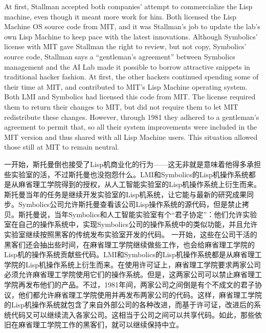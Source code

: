 \ifdefined\eng
\ifdefined\vone
At first, Stallman accepted both companies' attempt to commercialize the Lisp machine, even though it meant more work for him. Both licensed the Lisp Machine OS source code from MIT, and it was Stallman's job to update the lab's own Lisp Machine to keep pace with the latest innovations. Although Symbolics' license with MIT gave Stallman the right to review, but not copy, Symbolics' source code, Stallman says a ``gentleman's agreement'' between Symbolics management and the AI Lab made it possible to borrow attractive snippets in traditional hacker fashion.
\fi
\ifdefined\vtwo
At first, the other hackers continued spending some of their time at MIT, and contributed to MIT's Lisp Machine operating system. Both LMI and Symbolics had licensed this code from MIT. The license required them to return their changes to MIT, but did not require them to let MIT redistribute these changes.  However, through 1981 they adhered to a gentleman's agreement to permit that, so all their system improvements were included in the MIT version and thus shared with all Lisp Machine users. This situation allowed those still at MIT to remain neutral.
\fi
\fi

\ifdefined\chs
\ifdefined\vone
一开始，斯托曼倒也接受了Lisp机商业化的行为——这无非就是意味着他得多承担些实验室的活，不过斯托曼也没抱怨什么。LMI和Symbolics的Lisp机操作系统都是从麻省理工学院得到的授权，从人工智能实验室的Lisp机操作系统上衍生而来。斯托曼当年的任务是继续开发实验室的Lisp机系统，让它能与最新的研究成果同步。Symbolics公司允许斯托曼查看该公司Lisp操作系统的源代码，但是禁止拷贝。斯托曼说，当年Symbolics和人工智能实验室有个``君子协定''：他们允许实验室在自己的操作系统中，实现Symbolics公司的操作系统中的类似功能，并且允许实验室继续按照黑客的传统发布实验室开发的代码。
\fi
\ifdefined\vtwo
一开始，这些在公司干活的黑客们还会抽出些时间，在麻省理工学院继续做些工作，也会给麻省理工学院的Lisp机的操作系统贡献些代码。LMI和Symbolics的Lisp机操作系统都是从麻省理工学院的Lisp机操作系统上衍生而来。在使用许可证上，麻省理工学院要求两家公司必须允许麻省理工学院使用它们的操作系统。但是，这两家公司可以禁止麻省理工学院再发布他们的产品。不过，1981年间，两家公司之间倒是有个不成文的君子协议，他们都允许麻省理工学院使用并再发布两家公司的代码。这样，麻省理工学院的Lisp机操作系统就包含了来自外部公司的各种改进，而基于许可证，改进后的系统代码又可以继续流入各家公司。这相当于公司之间可以共享代码。如此，那些依旧在麻省理工学院工作的黑客们，就可以继续保持中立。
\fi
\fi

